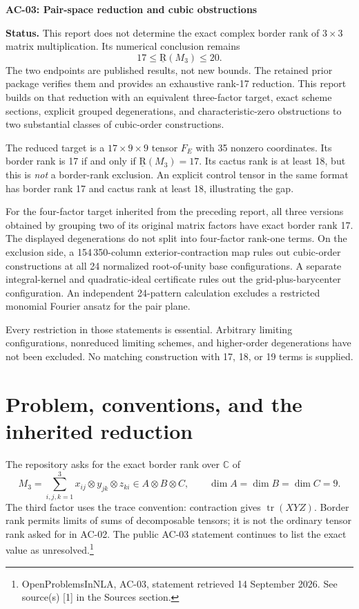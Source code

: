 \documentclass[11pt]{article}
\theoremstyle{definition}\newtheorem{definition}[theorem]{Definition}
\theoremstyle{remark}\newtheorem{remark}[theorem]{Remark}
\newcommand{\C}{\mathbb C}
\newcommand{\br}{\underline{\mathrm R}}
\newcommand{\src}[2]{\footnote{#1. See source(s) [#2] in the Sources section.}}
\begin{document}
\begin{center}
{\LARGE\bfseries AC-03: Pair-space reduction and cubic obstructions}
\end{center}

\textbf{Status.} This report does not determine the exact complex border rank of
$3\times3$ matrix multiplication. Its numerical conclusion remains
\[
\boxed{17\leq\br(M_3)\leq20.}
\]
The two endpoints are published results, not new bounds. The retained prior
package verifies them and provides an exhaustive rank-17 reduction. This report
builds on that reduction with an equivalent three-factor target, exact scheme
sections, explicit grouped degenerations, and characteristic-zero obstructions
to two substantial classes of cubic-order constructions.

The reduced target is a $17\times9\times9$ tensor $F_E$ with 35 nonzero coordinates.
Its border rank is 17 if and only if $\br(M_3)=17$. Its cactus rank is at least 18,
but this is \emph{not} a border-rank exclusion. An explicit control tensor in the
same format has border rank 17 and cactus rank at least 18, illustrating the gap.

For the four-factor target inherited from the preceding report, all three
versions obtained by grouping two of its original matrix factors have exact
border rank 17. The displayed degenerations do not split into four-factor
rank-one terms. On the exclusion side, a 154\,350-column exterior-contraction map
rules out cubic-order constructions at all 24 normalized root-of-unity base
configurations. A separate integral-kernel and quadratic-ideal certificate rules
out the grid-plus-barycenter configuration. An independent 24-pattern calculation
excludes a restricted monomial Fourier ansatz for the pair plane.

Every restriction in those statements is essential. Arbitrary limiting
configurations, nonreduced limiting schemes, and higher-order degenerations have
not been excluded. No matching construction with 17, 18, or 19 terms is supplied.

\newpage
\tableofcontents
\newpage

\section{Problem, conventions, and the inherited reduction}

The repository asks for the exact border rank over $\C$ of
\begin{equation}\label{eq:M}
 M_3=\sum_{i,j,k=1}^{3}x_{ij}\otimes y_{jk}\otimes z_{ki}
 \in A\otimes B\otimes C,\qquad \dim A=\dim B=\dim C=9.
\end{equation}
The third factor uses the trace convention: contraction gives
$\operatorname{tr}(XYZ)$. Border rank permits limits of sums of decomposable
tensors; it is not the ordinary tensor rank asked for in AC-02. The public
AC-03 statement continues to list the exact value as unresolved.\src{OpenProblemsInNLA,
AC-03, statement retrieved 14 September 2026}{1}
\end{document}

